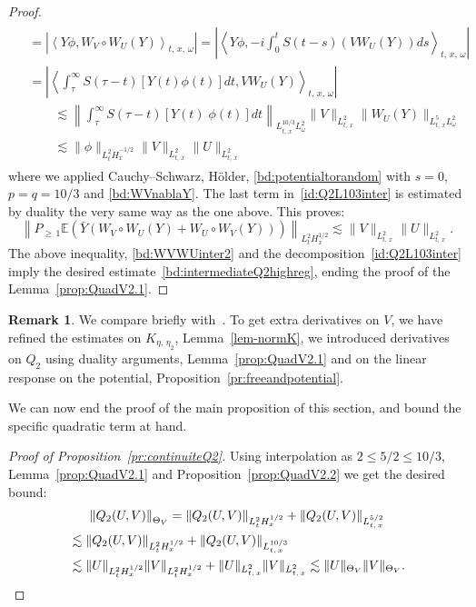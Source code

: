 \documentclass[10pt]{amsart}
\theoremstyle{definition}\newtheorem{defi}[theo]{Definition}\newtheorem{rema}[theo]{Remark}\newtheorem{exam}[theo]{Example}\newtheorem{exem}[theo]{Example}\newtheorem{nota}[theo]{Notation}
\newcommand{\E}{\mathbb{E}}
\begin{document}
\begin{proof}
\begin{multline*}
\begin{aligned}
&=\left| \left\langle Y\phi,W_V\circ W_U (Y)\right\rangle_{t,\,x,\,\omega}\right|= \left|\left\langle Y \phi,-i\int_0^t S(t-s)(VW_U(Y))ds\right\rangle_{t,\,x,\,\omega}\right|\\
&=\left| \left\langle \int_{\tau}^\infty S(\tau - t)[Y(t) \phi (t)]dt,V W_U(Y)\right\rangle_{t,\,x,\,\omega}\right| \\
&\qquad \lesssim \left\| \int_{\tau}^\infty S(\tau - t)\left[Y(t)\; \phi (t)\right]dt \right\|_{L^{10/3}_{t,\,x}L^2_\omega}\| V \|_{L^2_{t,\,x}} \| W_U(Y)\|_{L^{5}_{t,\,x}L^2_\omega}\\
&\qquad \lesssim \| \phi \|_{L^2_t\dot H^{-1/2}_x} \| V \|_{L^2_{t,\,x}} \| U \|_{L^2_{t,\,x}}
\end{aligned}
\end{multline*}
where we applied Cauchy--Schwarz, H\"older, \eqref{bd:potentialtorandom} with $s=0$, $p=q=10/3$ and \eqref{bd:WVnablaY}. The last term in~\eqref{id:Q2L103inter} is estimated by duality the very same way as the one above. This proves:
\[
\left\| P_{\geq\,1} \E\left(\bar Y\left(W_V\circ W_U(Y) + W_U\circ W_V(Y)\right)\right) \right\|_{L^2_t H^{1/2}_x} \lesssim \| V \|_{L^2_{t,\,x}} \| U \|_{L^2_{t,\,x}}.
\]
The above inequality, \eqref{bd:WVWUinter2} and the decomposition~\eqref{id:Q2L103inter} imply the desired estimate~\eqref{bd:intermediateQ2highreg}, ending the proof of the Lemma~\ref{prop:QuadV2.1}.
\end{proof}

\begin{rema}\label{rem:laRemarque}
We compare briefly with~\cite{lewsab2}. To get extra derivatives on $V$, we have refined the estimates on $K_{\eta,\,\eta_2}$, Lemma~\ref{lem-normK}, we introduced derivatives on $Q_2$ using duality arguments, Lemma~\ref{prop:QuadV2.1} and on the linear response on the potential, Proposition~\ref{pr:freeandpotential}.
\end{rema}



We can now end the proof of the main proposition of this section, and bound the specific quadratic term at hand.


\begin{proof}[Proof of Proposition~\ref{pr:continuiteQ2}]
Using interpolation as $2\leq 5/2\leq 10/3$, Lemma~\ref{prop:QuadV2.1} and Proposition~\ref{prop:QuadV2.2} we get the desired bound:
\begin{multline*}
\left\| Q_2(U,V)\right\|_{\Theta_V} =
\left\| Q_2(U,V)\right\|_{L^2_{t}H^{1/2}_x}+\left\| Q_2(U,V)\right\|_{L^{5/2}_{t,\,x}}\\
\begin{aligned}
&\lesssim \left\| Q_2(U,V)\right\|_{L^2_{t}H^{1/2}_x}+\left\| Q_2(U,V)\right\|_{L^{10/3}_{t,\,x}}\\
& \lesssim \| U\|_{L^2_{t}H^{1/2}_x}\| V\|_{L^2_{t}H^{1/2}_x}+\| U\|_{L^2_{t,\,x}}\| V\|_{L^2_{t,\,x}} \lesssim \| U \|_{\Theta_V}\| V\|_{\Theta_V}.\qedhere
\end{aligned}
\end{multline*}
\end{proof}
\end{document}
